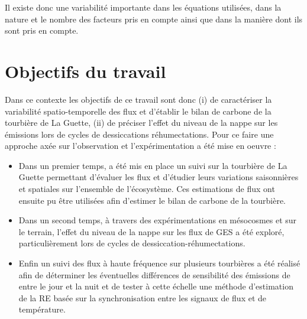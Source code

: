 Il existe donc une variabilité importante dans les équations utilisées, dans la nature et le nombre des facteurs pris en compte ainsi que dans la manière dont ils sont pris en compte.

\section{Objectifs du travail}
%
Dans ce contexte les objectifs de ce travail sont donc (i) de caractériser la variabilité spatio-temporelle des flux et d'établir le bilan de carbone de la tourbière de La Guette, (ii) de préciser l'effet du niveau de la nappe sur les émissions lors de cycles de dessiccations réhumectations.
Pour ce faire une approche axée sur l'observation et l'expérimentation a été mise en oeuvre : 
\begin{itemize}
\item Dans un premier temps, a été mis en place un suivi sur la tourbière de La Guette permettant d'évaluer les flux et d'étudier leurs variations saisonnières et spatiales sur l'ensemble de l'écosystème. Ces estimations de flux ont ensuite pu être utilisées afin d'estimer le bilan de carbone de la tourbière.
\item Dans un second temps, à travers des expérimentations en mésocosmes et sur le terrain, l'effet du niveau de la nappe sur les flux de GES a été exploré, particulièrement lors de cycles de dessiccation-réhumectations.
\item Enfin un suivi des flux à haute fréquence sur plusieurs tourbières a été réalisé afin de déterminer les éventuelles différences de sensibilité des émissions de \coo entre le jour et la nuit et de tester à cette échelle une méthode d'estimation de la RE basée sur la synchronisation entre les signaux de flux et de température.
\end{itemize}
